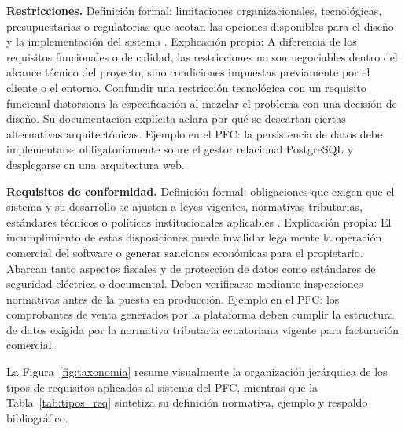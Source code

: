 \documentclass[onecolumn,12pt,a4paper]{IEEEtran}
\begin{document}
	\textbf{Restricciones.} Definici\'on formal: limitaciones organizacionales, tecnol\'ogicas, presupuestarias o regulatorias que acotan las opciones disponibles para el dise\~no y la implementaci\'on del sistema \cite{pohl2025,glinz2007,ireb2023}. Explicaci\'on propia: A diferencia de los requisitos funcionales o de calidad, las restricciones no son negociables dentro del alcance t\'ecnico del proyecto, sino condiciones impuestas previamente por el cliente o el entorno. Confundir una restricci\'on tecnol\'ogica con un requisito funcional distorsiona la especificaci\'on al mezclar el problema con una decisi\'on de dise\~no. Su documentaci\'on expl\'icita aclara por qu\'e se descartan ciertas alternativas arquitect\'onicas. Ejemplo en el PFC: la persistencia de datos debe implementarse obligatoriamente sobre el gestor relacional PostgreSQL y desplegarse en una arquitectura web.

	\textbf{Requisitos de conformidad.} Definici\'on formal: obligaciones que exigen que el sistema y su desarrollo se ajusten a leyes vigentes, normativas tributarias, est\'andares t\'ecnicos o pol\'iticas institucionales aplicables \cite{iso29148,swebok4}. Explicaci\'on propia: El incumplimiento de estas disposiciones puede invalidar legalmente la operaci\'on comercial del software o generar sanciones econ\'omicas para el propietario. Abarcan tanto aspectos fiscales y de protecci\'on de datos como est\'andares de seguridad el\'ectrica o documental. Deben verificarse mediante inspecciones normativas antes de la puesta en producci\'on. Ejemplo en el PFC: los comprobantes de venta generados por la plataforma deben cumplir la estructura de datos exigida por la normativa tributaria ecuatoriana vigente para facturaci\'on comercial.

	La Figura~\ref{fig:taxonomia} resume visualmente la organizaci\'on jer\'arquica de los tipos de requisitos aplicados al sistema del PFC, mientras que la Tabla~\ref{tab:tipos_req} sintetiza su definici\'on normativa, ejemplo y respaldo bibliogr\'afico.
\end{document}

